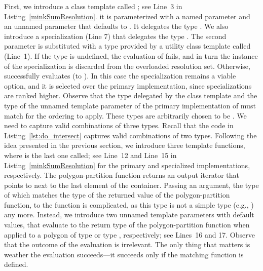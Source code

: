 First, we introduce a class template called ; see Line~3 in Listing~\ref{minkSumResolution}. it is parameterized with a named parameter  and an unnamed parameter that defaults to . It delegates the type . We also introduce a specialization (Line 7) that delegates the type . The second parameter is substituted with a type provided by a utility class template called  (Line~1). If the type  is undefined, the evaluation of  fails, and in turn the instance of the  specialization is discarded from the overloaded resolution set. Otherwise,  successfully evaluates (to ). In this case the  specialization remains a viable option, and it is selected over the primary implementation, since specializations are ranked higher. Observe that the type delegated by the  class template and the type of the unnamed template parameter of the primary implementation of  must match for the ordering to apply. These types are arbitrarily chosen to be .
%
We need to capture valid combinations of three types. Recall that the code in Listing~\ref{lst:do_intersect} captures valid combinations of two types. Following the idea presented in the previous section, we introduce three template functions, where  is the last one called; see Line~12 and Line~15 in Listing~\ref{minkSumResolution} for the primary and specialized implementations, respectively. The polygon-partition function returns an output iterator that points to next to the last element of the container. Passing an argument, the type of which matches the type of the returned value of the polygon-partition function, to the function  is complicated, as this type is not a simple type (e.g., ) any more. Instead, we introduce two unnamed template parameters with default values, that evaluate to the return type of the polygon-partition function when applied to a polygon of type  or type , respectively; see Lines~16 and 17. Observe that the outcome of the evaluation is irrelevant. The only thing that matters is weather the evaluation succeeds---it succeeds only if the matching function is defined.

